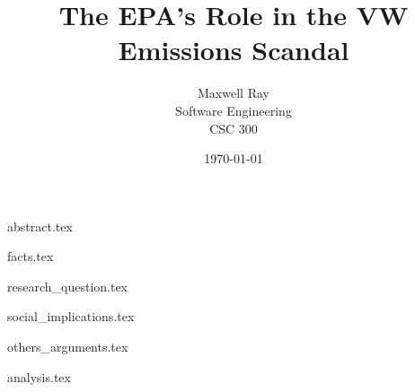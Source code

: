 \documentclass[12pt]{article}
\title{The EPA's Role in the VW Emissions Scandal}
\author{Maxwell Ray\\Software Engineering\\CSC 300}
\date{\today}
\newcommand*{\sectiondir}{final_draft/}
\begin{document}
\pagestyle{plain}

\maketitle

{abstract.tex}
\newpage

\tableofcontents
\newpage

\twocolumn
\setcounter{page}{1}

{facts.tex}

{research_question.tex}

{social_implications.tex}

{others_arguments.tex}

{analysis.tex}

\newpage
\onecolumn
{}
\nocite{*}


\end{document}
